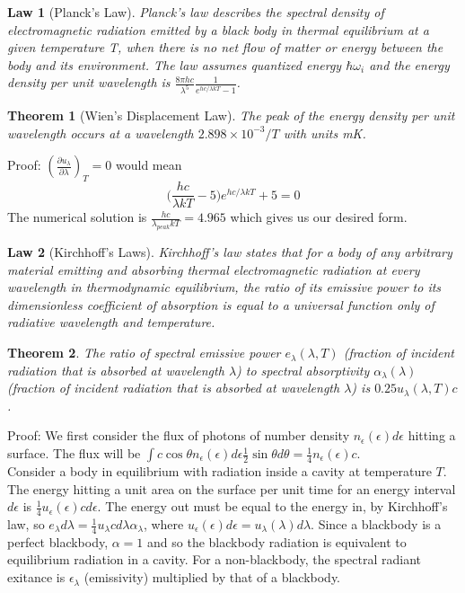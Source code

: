 \documentclass[a4paper]{article}
\newtheorem{law}{Law}[section]
\newtheorem{thm}{Theorem}[section]
\theoremstyle{new}
\begin{document}
\begin{law}[Planck's Law]
Planck's law describes the spectral density of electromagnetic radiation emitted by a black body in thermal equilibrium at a given temperature T, when there is no net flow of matter or energy between the body and its environment. The law assumes quantized energy $\hbar\omega_i$ and the energy density per unit wavelength is $\frac{8\pi hc}{\lambda^5}\frac{1}{e^{hc/\lambda kT}-1}$.
\end{law}
\begin{thm}[Wien's Displacement Law]
The peak of the energy density per unit wavelength occurs at a wavelength $2.898\times10^{-3}/T$ with units mK.
\end{thm}
Proof: $(\frac{\partial u_\lambda}{\partial\lambda})_T=0$ would mean
$$\bigg(\frac{hc}{\lambda kT}-5\bigg)e^{hc/\lambda kT}+5=0$$
The numerical solution is $\frac{hc}{\lambda_{peak}kT}=4.965$ which gives us our desired form.
\begin{law}[Kirchhoff's Laws]
Kirchhoff's law states that for a body of any arbitrary material emitting and absorbing thermal electromagnetic radiation at every wavelength in thermodynamic equilibrium, the ratio of its emissive power to its dimensionless coefficient of absorption is equal to a universal function only of radiative wavelength and temperature.
\end{law}
\begin{thm}
The ratio of spectral emissive power $e_\lambda(\lambda,T)$ (fraction of incident radiation that is absorbed at wavelength $\lambda$) to spectral absorptivity $\alpha_\lambda(\lambda)$ (fraction of incident radiation that is absorbed at wavelength $\lambda$) is $0.25u_\lambda(\lambda,T)c$.
\end{thm}
Proof: We first consider the flux of photons of number density $n_\epsilon(\epsilon)d\epsilon$ hitting a surface. The flux will be $\int c\cos\theta n_\epsilon(\epsilon)d\epsilon\frac{1}{2}\sin\theta d\theta=\frac{1}{4}n_\epsilon(\epsilon)c$.\\[5pt]
Consider a body in equilibrium with radiation inside a cavity at temperature $T$. The energy hitting a unit area on the surface per unit time for an energy interval $d\epsilon$ is $\frac{1}{4}u_\epsilon(\epsilon) cd\epsilon$. The energy out must be equal to the energy in, by Kirchhoff's law, so $e_\lambda d\lambda=\frac{1}{4}u_\lambda cd\lambda \alpha_\lambda$, where $u_\epsilon(\epsilon)d\epsilon=u_\lambda(\lambda)d\lambda$. Since a blackbody is a perfect blackbody, $\alpha=1$ and so the blackbody radiation is equivalent to equilibrium radiation in a cavity. For a non-blackbody, the spectral radiant exitance is $\epsilon_\lambda$ (emissivity) multiplied by that of a blackbody. 
\end{document}
